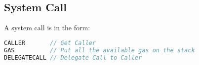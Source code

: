 \documentclass[english,a4paper]{article}
\begin{document}
\subsection{System Call}
A system call is in the form:

\begin{minipage}{\linewidth}
\small
\begin{lstlisting}[language=c,commentstyle=\color{mygreen},basicstyle=\ttfamily,
  identifierstyle=\color{blue},
  caption=Sequence of steps to perform a system call.]
CALLER       // Get Caller
GAS          // Put all the available gas on the stack
DELEGATECALL // Delegate Call to Caller
\end{lstlisting}
\end{minipage}
\end{document}
